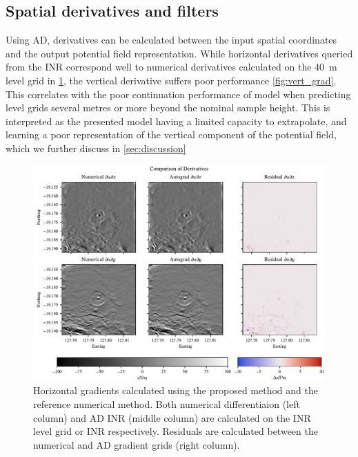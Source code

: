 \documentclass[manuscript.tex]{subfiles}
\begin{document}
\subsection{Spatial derivatives and filters}
Using AD, derivatives can be calculated between the input spatial coordinates and the output potential field representation.
While horizontal derivatives queried from the INR correspond well to numerical derivatives calculated on the \SI{40}{\m} level grid in \cref{fig:hori_grad}, the vertical derivative suffers poor performance \cref{fig:vert_grad}.
This correlates with the poor continuation performance of model when predicting level grids several metres or more beyond the nominal sample height.
This is interpreted as the presented model having a limited capacity to extrapolate, and learning a poor representation of the vertical component of the potential field, which we further discuss in \cref{sec:discussion}

\begin{figure}[hbt]
    \centering{}
    \includegraphics[width=1.0\linewidth]{fig/p3/P864_dh_comparison.pdf}
    \caption[Horizontal derivatives]{Horizontal gradients calculated using the proposed method and the reference numerical method.
        Both numerical differentiaion (left column) and AD INR (middle column) are calculated on the INR level grid or INR respectively.
        Residuals are calculated between the numerical and AD gradient grids (right column).}
    \label{fig:hori_grad}
\end{figure}
\end{document}
